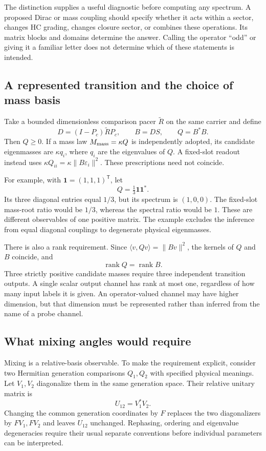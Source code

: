 \documentclass[11pt,a4paper]{article}
\begin{document}
The distinction supplies a useful diagnostic before computing any
spectrum. A proposed Dirac or mass coupling should specify whether
it acts within a sector, changes HC grading, changes closure sector,
or combines these operations. Its matrix blocks and domains determine
the answer. Calling the operator ``odd'' or giving it a familiar
letter does not determine which of these statements is intended.

\subsection{A represented transition and the choice of mass basis}
Take a bounded dimensionless comparison pacer $\widetilde R$ on the
same carrier and define
\begin{equation}
 D=(I-P_c)\widetilde R P_c,\qquad B=DS,\qquad Q=B^*B.
\end{equation}
Then $Q\geq0$. If a mass law $M_{\rm mass}=\kappa Q$ is independently
adopted, its candidate eigenmasses are $\kappa q_i$, where $q_i$
are the eigenvalues of $Q$. A fixed-slot readout instead uses
$\kappa Q_{ii}=\kappa\|B\varepsilon_i\|^2$. These prescriptions
need not coincide.

For example, with $\boldsymbol1=(1,1,1)^{\mathsf T}$, let
\begin{equation}
 Q=\tfrac13\boldsymbol1\boldsymbol1^*.
\end{equation}
Its three diagonal entries equal $1/3$, but its spectrum is $(1,0,0)$.
The fixed-slot mass-root ratio would be $1/3$, whereas the spectral
ratio would be $1$. These are different observables of one positive
matrix. The example excludes the inference from equal diagonal
couplings to degenerate physical eigenmasses.

There is also a rank requirement. Since
$\langle v,Qv\rangle=\|Bv\|^2$, the kernels of $Q$ and $B$
coincide, and
\begin{equation}
 \operatorname{rank}Q=\operatorname{rank}B.
\end{equation}
Three strictly positive candidate masses require three independent
transition outputs. A single scalar output channel has rank at most
one, regardless of how many input labels it is given. An operator-valued
channel may have higher dimension, but that dimension must be represented
rather than inferred from the name of a probe channel.

\subsection{What mixing angles would require}
Mixing is a relative-basis observable. To make the requirement explicit,
consider two Hermitian generation comparisons $Q_1,Q_2$ with specified
physical meanings. Let $V_1,V_2$ diagonalize them in the same generation
space. Their relative unitary matrix is
\begin{equation}
 U_{12}=V_1^*V_2.
\end{equation}
Changing the common generation coordinates by $F$ replaces the two
diagonalizers by $FV_1,FV_2$ and leaves $U_{12}$ unchanged. Rephasing,
ordering and eigenvalue degeneracies require their usual separate
conventions before individual parameters can be interpreted.
\end{document}
